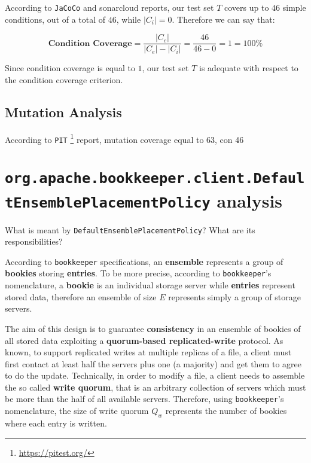 \documentclass[conference, onecolumn]{IEEEtran}
\newcommand{\abs}[1]{\left|#1\right|}
\begin{document}
According to \texttt{JaCoCo} and sonarcloud reports, our test set $T$ covers up to $46$ simple conditions, out of a total of $46$, while $\abs{C_i} = 0$. Therefore we can say that:

\begin{equation} 
\textbf{Condition Coverage} = \dfrac{\abs{C_c}}{\abs{C_e} - \abs{C_i}} = \dfrac{46}{46-0} = 1 = 100\%
\end{equation}

Since condition coverage is equal to $1$, our test set $T$ is adequate with respect to the condition coverage criterion. 


\subsection{Mutation Analysis}


According to \texttt{PIT} \footnote{\url{https://pitest.org/}} report, mutation coverage equal to 63, con 46 



\section{\texttt{org.apache.bookkeeper.client.DefaultEnsemblePlacementPolicy} analysis}

What is meant by \texttt{DefaultEnsemblePlacementPolicy}? What are its responsibilities?

According to \texttt{bookkeeper} specifications\cite{BookKeeperArchitecture}, an \textbf{ensemble} represents a group of \textbf{bookies} storing \textbf{entries}. To be more precise, according to \texttt{bookkeeper}'s nomenclature, a \textbf{bookie} is an individual storage server while \textbf{entries} represent stored data, therefore an ensemble of size $E$ represents simply a group of storage servers.

The aim of this design is to guarantee \textbf{consistency} in an ensemble of bookies of all stored data exploiting a \textbf{quorum-based replicated-write} protocol. As known, to support replicated writes at multiple replicas of a file, a client must first contact at least half the servers plus one (a majority) and get them to agree to do the update\cite{Tanenbaum}. Technically, in order to modify a file, a client needs to assemble the so called \textbf{write quorum}, that is an arbitrary collection of servers which must be more than the half of all available servers\cite{Tanenbaum}. Therefore, using \texttt{bookkeeper}'s nomenclature, the size of write quorum $Q_w$ represents the number of bookies where each entry is written. 
\end{document}
